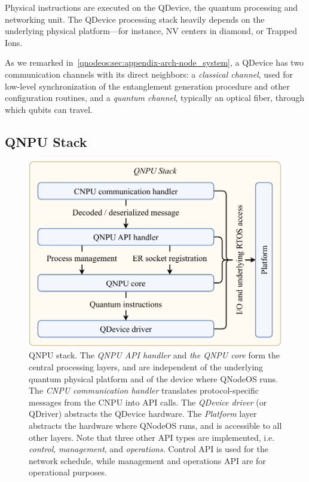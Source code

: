 Physical instructions are executed on the \ac{QDevice}, the quantum processing and networking unit. The \ac{QDevice} processing stack heavily depends on the underlying physical platform---for instance, \ac{NV} centers in diamond, or Trapped Ions.

As we remarked in~\cref{qnodeos:sec:appendix-arch-node_system}, a \ac{QDevice} has two communication channels with its direct neighbors: a \emph{classical channel}, used for low-level synchronization of the entanglement generation procedure and other configuration routines, and a \emph{quantum channel}, typically an optical fiber, through which qubits can travel.

\subsection{QNPU Stack}
\label{qnodeos:sec:design:qnpu_stack}

\begin{figure}
\begin{center}
\includegraphics[width=\linewidth]{figures/qnodeos/supplementary/qnodeos-stack.pdf}
\end{center}
\caption[]{\ac{QNPU} stack. The \emph{\ac{QNPU} \acs{API} handler} and \emph{the \ac{QNPU} core} form the central processing layers, and are independent of the underlying quantum physical platform and of the device where \ac{QNodeOS} runs. The \emph{\ac{CNPU} communication handler} translates protocol-specific messages from the \ac{CNPU} into \acs{API} calls. The \emph{\ac{QDevice} driver} (or \ac{QDriver}) abstracts the \ac{QDevice} hardware. The \emph{Platform} layer abstracts the hardware where \ac{QNodeOS} runs, and is accessible to all other layers. Note that three other \ac{API} types are implemented, i.e. \emph{control}, \emph{management}, and \emph{operations}. Control \ac{API} is used for the network schedule, while management and operations \ac{API} are for operational purposes. }
\label{qnodeos:fig:qnodeos-stack}
\end{figure}

